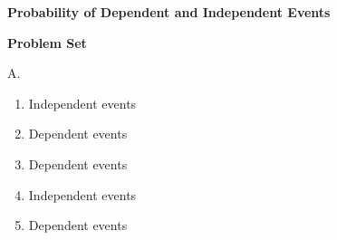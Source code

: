 \begin{center}
\textbf{Probability of Dependent and Independent Events}\\
\end{center}

\vspace*{1ex}

\textbf{Problem Set}

\vspce

A. %

\begin{enumerate}[label = \arabic*. ]
\item %
Independent events \redcheck 

\item %
Dependent events \redcheck 

\item %
Dependent events \redcheck 

\item %
Independent events \redcheck 

\item %
Dependent events \redcheck 

\end{enumerate}  

